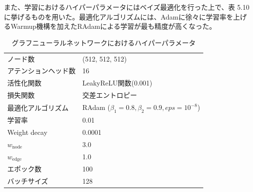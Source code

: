 また、学習におけるハイパーパラメータにはベイズ最適化を行った上で、表 5.10%
に挙げるものを用いた。最適化アルゴリズムには、Adamに徐々に学習率を上げるWarmup機構を加えたRAdamによる学習が最も精度が高くなった。
\begin{table}[H]
 \centering
  \begin{tabular}{ l  l }
   \hline
   ノード数 & (512, 512, 512)\\
   アテンションヘッド数 & 16\\
   活性化関数 & LeakyReLU関数(0.001)\\
   損失関数 & 交差エントロピー\\
   最適化アルゴリズム & RAdam ($\beta_1 = 0.8, \beta_2 = 0.9, eps = 10^{-8}$)\\
   学習率 & 0.01\\
   Weight decay & 0.0001\\
    $w_{\mathrm{node}}$ & 3.0\\
    $w_{\mathrm{edge}}$ & 1.0\\
   エポック数 & 100\\
   バッチサイズ & 128\\
   \hline
  \end{tabular}
  \label{gnnsetting}
  \caption{グラフニューラルネットワークにおけるハイパーパラメータ}
\end{table}

